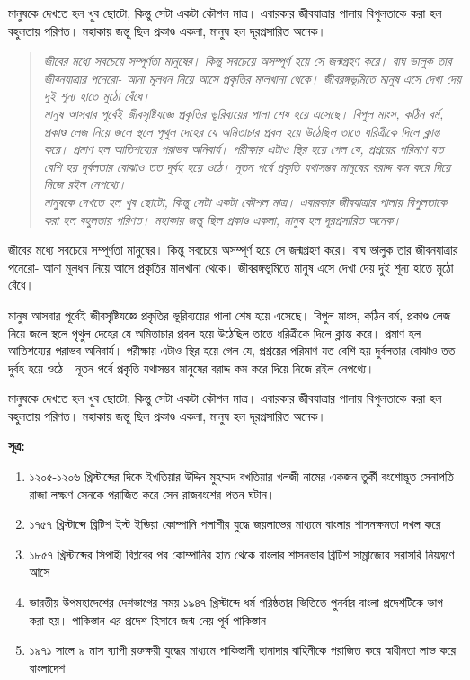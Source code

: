 মানুষকে দেখতে হল খুব ছোটো, কিন্তু সেটা একটা কৌশল মাত্র। এবারকার জীবযাত্রার পালায় বিপুলতাকে করা হল বহুলতায় পরিণত। মহাকায় জন্তু ছিল প্রকাণ্ড একলা, মানুষ হল দূরপ্রসারিত অনেক। 
\begin{quotation}
	\textit{জীবের মধ্যে সবচেয়ে সম্পূর্ণতা মানুষের। কিন্তু সবচেয়ে অসম্পূর্ণ হয়ে সে জন্মগ্রহণ করে। বাঘ ভালুক তার জীবনযাত্রার পনেরো- আনা মূলধন নিয়ে আসে প্রকৃতির মালখানা থেকে। জীবরঙ্গভূমিতে মানুষ এসে দেখা দেয় দুই শূন্য হাতে মুঠো বেঁধে।\\
	মানুষ আসবার পূর্বেই জীবসৃষ্টিযজ্ঞে প্রকৃতির ভূরিব্যয়ের পালা শেষ হয়ে এসেছে। বিপুল মাংস, কঠিন বর্ম, প্রকাণ্ড লেজ নিয়ে জলে স্থলে পৃথুল দেহের যে অমিতাচার প্রবল হয়ে উঠেছিল তাতে ধরিত্রীকে দিলে ক্লান্ত করে। প্রমাণ হল আতিশয্যের পরাভব অনিবার্য। পরীক্ষায় এটাও স্থির হয়ে গেল যে, প্রশ্রয়ের পরিমাণ যত বেশি হয় দুর্বলতার বোঝাও তত দুর্বহ হয়ে ওঠে। নূতন পর্বে প্রকৃতি যথাসম্ভব মানুষের বরাদ্দ কম করে দিয়ে নিজে রইল নেপথ্যে।\\
	মানুষকে দেখতে হল খুব ছোটো, কিন্তু সেটা একটা কৌশল মাত্র। এবারকার জীবযাত্রার পালায় বিপুলতাকে করা হল বহুলতায় পরিণত। মহাকায় জন্তু ছিল প্রকাণ্ড একলা, মানুষ হল দূরপ্রসারিত অনেক।}
\end{quotation}
জীবের মধ্যে সবচেয়ে সম্পূর্ণতা মানুষের। কিন্তু সবচেয়ে অসম্পূর্ণ হয়ে সে জন্মগ্রহণ করে। বাঘ ভালুক তার জীবনযাত্রার পনেরো- আনা মূলধন নিয়ে আসে প্রকৃতির মালখানা থেকে। জীবরঙ্গভূমিতে মানুষ এসে দেখা দেয় দুই শূন্য হাতে মুঠো বেঁধে।

মানুষ আসবার পূর্বেই জীবসৃষ্টিযজ্ঞে প্রকৃতির ভূরিব্যয়ের পালা শেষ হয়ে এসেছে। বিপুল মাংস, কঠিন বর্ম, প্রকাণ্ড লেজ নিয়ে জলে স্থলে পৃথুল দেহের যে অমিতাচার প্রবল হয়ে উঠেছিল তাতে ধরিত্রীকে দিলে ক্লান্ত করে। প্রমাণ হল আতিশয্যের পরাভব অনিবার্য। পরীক্ষায় এটাও স্থির হয়ে গেল যে, প্রশ্রয়ের পরিমাণ যত বেশি হয় দুর্বলতার বোঝাও তত দুর্বহ হয়ে ওঠে। নূতন পর্বে প্রকৃতি যথাসম্ভব মানুষের বরাদ্দ কম করে দিয়ে নিজে রইল নেপথ্যে।

মানুষকে দেখতে হল খুব ছোটো, কিন্তু সেটা একটা কৌশল মাত্র। এবারকার জীবযাত্রার পালায় বিপুলতাকে করা হল বহুলতায় পরিণত। মহাকায় জন্তু ছিল প্রকাণ্ড একলা, মানুষ হল দূরপ্রসারিত অনেক।

\vskip 30pt
\scriptsize
\textbf{সূত্র:}
\begin{enumerate}%
	\item ১২০৫-১২০৬ খ্রিস্টাব্দের দিকে ইখতিয়ার উদ্দিন মুহম্মদ বখতিয়ার খলজী নামের একজন তুর্কী বংশোদ্ভূত সেনাপতি রাজা লক্ষ্মণ সেনকে পরাজিত করে সেন রাজবংশের পতন ঘটান।
	\item ১৭৫৭ খ্রিস্টাব্দে ব্রিটিশ ইস্ট ইন্ডিয়া কোম্পানি পলাশীর যুদ্ধে জয়লাভের মাধ্যমে বাংলার শাসনক্ষমতা দখল করে
	\item ১৮৫৭ খ্রিস্টাব্দের সিপাহী বিপ্লবের পর কোম্পানির হাত থেকে বাংলার শাসনভার ব্রিটিশ সাম্রাজ্যের সরাসরি নিয়ন্ত্রণে আসে
	\item ভারতীয় উপমহাদেশের দেশভাগের সময় ১৯৪৭ খ্রিস্টাব্দে ধর্ম গরিষ্ঠতার ভিত্তিতে পুনর্বার বাংলা প্রদেশটিকে ভাগ করা হয়। পাকিস্তান এর প্রদেশ হিসাবে জন্ম নেয় পূর্ব পাকিস্তান 
	\item ১৯৭১ সালে ৯ মাস ব্যাপী রক্তক্ষয়ী যুদ্ধের মাধ্যমে পাকিস্তানী হানাদার বাহিনীকে পরাজিত করে স্বাধীনতা লাভ করে বাংলাদেশ 
\end{enumerate}